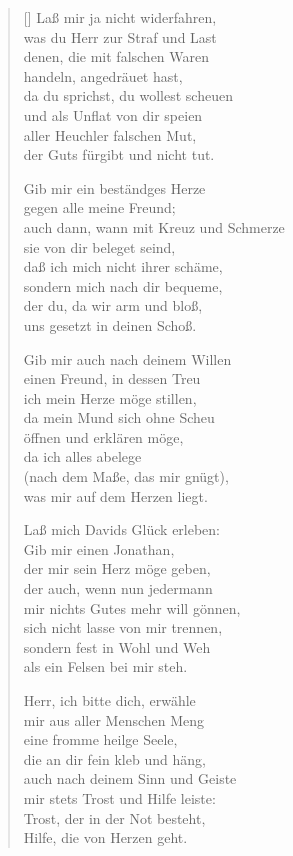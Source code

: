 \begin{multicols}{2}
\begin{verse}[\versewidth]
 Laß mir ja nicht widerfahren,\\
was du Herr zur Straf und Last\\
denen, die mit falschen Waren\\
handeln, angedräuet hast,\\
da du sprichst, du wollest scheuen\\
und als Unflat von dir speien\\
aller Heuchler falschen Mut,\\
der Guts fürgibt und nicht tut.

 Gib mir ein beständges Herze\\
gegen alle meine Freund;\\
auch dann, wann mit Kreuz und Schmerze\\
sie von dir beleget seind,\\
daß ich mich nicht ihrer schäme,\\
sondern mich nach dir bequeme,\\
der du, da wir arm und bloß,\\
uns gesetzt in deinen Schoß.

 Gib mir auch nach deinem Willen\\
einen Freund, in dessen Treu\\
ich mein Herze möge stillen,\\
da mein Mund sich ohne Scheu\\
öffnen und erklären möge,\\
da ich alles abelege\\
(nach dem Maße, das mir gnügt),\\
was mir auf dem Herzen liegt.

 Laß mich Davids Glück erleben:\\
Gib mir einen Jonathan,\\
der mir sein Herz möge geben,\\
der auch, wenn nun jedermann\\
mir nichts Gutes mehr will gönnen,\\
sich nicht lasse von mir trennen,\\
sondern fest in Wohl und Weh\\
als ein Felsen bei mir steh.

 Herr, ich bitte dich, erwähle\\
mir aus aller Menschen Meng\\
eine fromme heilge Seele,\\
die an dir fein kleb und häng,\\
auch nach deinem Sinn und Geiste\\
mir stets Trost und Hilfe leiste:\\
Trost, der in der Not besteht,\\
Hilfe, die von Herzen geht.


\end{verse}
\end{multicols}
